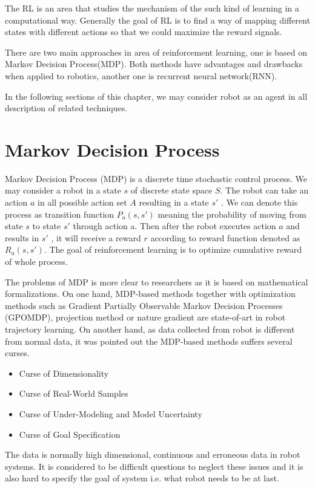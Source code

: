 \documentclass[officiallayout]{tktla}
\begin{document}
The RL is an area that studies the mechanism of the such kind of learning in a computational way. Generally the goal of RL is to find a way of mapping different states with different actions so that we could maximize the reward signals. 

There are two main approaches in area of reinforcement learning, one is based on Markov Decision Process(MDP)\cite{Sutton1998a}. Both methods have advantages and drawbacks when applied to robotics, another one is recurrent neural network(RNN)\cite{williams1989learning}.

In the following sections of this chapter, we may consider robot as an agent in all description of related techniques.

\section{Markov Decision Process}
Markov Decision Process (MDP) is a discrete time stochastic control process. We may consider a robot in a state $s$ of discrete state space $S$. The robot can take an action $a$ in all possible action set $A$ resulting in a state $s'$ . We can denote this process as transition function
$P_a(s, s')$ meaning the probability of moving from state
$s$ to state $s'$ through action a. Then after the robot executes action $a$ and results in $s'$ , it will receive a reward $r$ according to reward function denoted as $R_a(s, s ')$. The goal of reinforcement learning is to optimize cumulative reward of whole process. 

The problems of MDP is more clear to researchers as it is based on mathematical formalizations. On one hand, MDP-based methods together with optimization methods such as Gradient Partially Observable Markov Decision Processes (GPOMDP), projection method or nature gradient are state-of-art in robot trajectory learning. On another hand, as data collected from robot is different from normal data, it was pointed out the MDP-based methods suffers several curses\cite{Kober2013}.
\begin{itemize}
\item Curse of Dimensionality
\item Curse of Real-World Samples
\item Curse of Under-Modeling and Model Uncertainty
\item Curse of Goal Specification
\end{itemize}
The data is normally high dimensional, continuous and erroneous data in robot systems. It is considered to be difficult questions to neglect these issues and it is also hard to specify the goal of system i.e. what robot needs to be at last.
\end{document}
